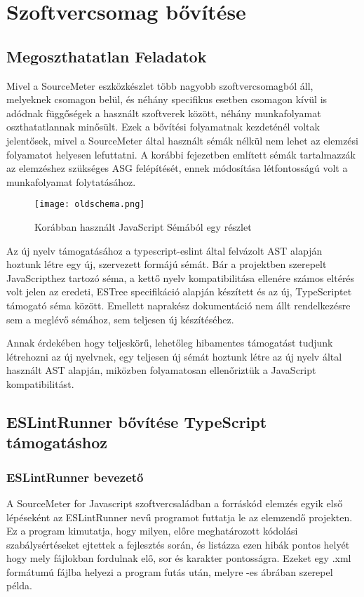 \chapter{Szoftvercsomag bővítése}
\label{chap:fejezet4}

\section{Megoszthatatlan Feladatok}

Mivel a SourceMeter eszközkészlet több nagyobb szoftvercsomagból áll, melyeknek csomagon belül, és néhány specifikus esetben csomagon kívül is adódnak függőségek a használt szoftverek között, néhány munkafolyamat oszthatatlannak minősült. Ezek a bővítési folyamatnak kezdeténél voltak jelentősek, mivel a SourceMeter által használt sémák nélkül nem lehet az elemzési folyamatot helyesen lefuttatni. A korábbi fejezetben említett sémák tartalmazzák az elemzéshez szükséges ASG felépítését, ennek módosítása létfontosságú volt a munkafolyamat folytatásához.

\begin{figure}[!htbp]
    \caption{Korábban használt JavaScript Sémából egy részlet}\label{fig:apocalypse}
    \centering
    \texttt{[image: oldschema.png]}
\end{figure}

Az új nyelv támogatásához a typescript-eslint által felvázolt AST \cite{typescript-eslint-ast} alapján hoztunk létre egy új, szervezett formájú sémát. Bár a projektben szerepelt JavaScripthez tartozó séma, a kettő nyelv kompatibilitása ellenére számos eltérés volt jelen az eredeti, ESTree specifikáció \cite{estree-spec} alapján készített és az új, TypeScriptet támogató séma között. Emellett naprakész dokumentáció nem állt rendelkezésre sem a meglévő sémához, sem teljesen új készítéséhez.

Annak érdekében hogy teljeskörű, lehetőleg hibamentes támogatást tudjunk létrehozni az új nyelvnek, egy teljesen új sémát hoztunk létre az új nyelv által használt AST alapján, miközben folyamatosan ellenőriztük a JavaScript kompatibilitást. 

\section{ESLintRunner bővítése TypeScript támogatáshoz}

\subsection{ESLintRunner bevezető}
A SourceMeter for Javascript szoftvercsaládban a forráskód elemzés egyik első lépéseként az ESLintRunner nevű programot futtatja le az elemzendő projekten. Ez a program kimutatja, hogy milyen, előre meghatározott kódolási szabálysértéseket ejtettek a fejlesztés során, és listázza ezen hibák pontos helyét hogy mely fájlokban fordulnak elő, sor és karakter pontosságra. Ezeket egy .xml formátumú fájlba helyezi a program futás után, melyre -es ábrában szerepel példa.

